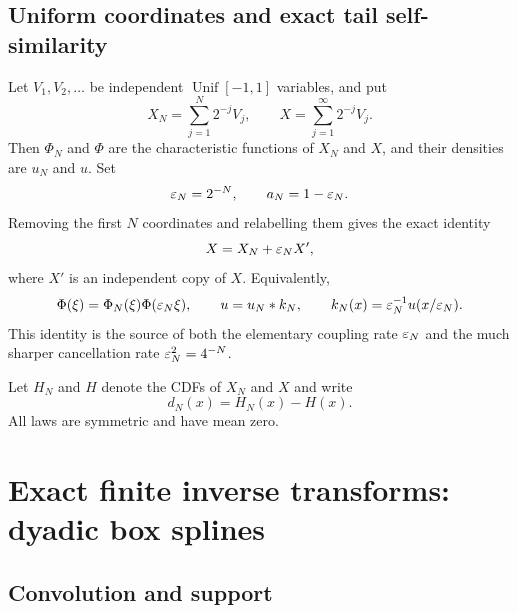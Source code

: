 \documentclass[11pt,oneside]{article}
\numberwithin{equation}{section}
\theoremstyle{definition}
\theoremstyle{remark}
\begin{document}
\subsection{Uniform coordinates and exact tail self-similarity}

Let $V_1,V_2,\ldots$ be independent $\operatorname{Unif}[-1,1]$ variables, and put
\begin{equation}
 X_N=\sum_{j=1}^{N}2^{-j}V_j,
 \qquad
 X=\sum_{j=1}^{\infty}2^{-j}V_j.
 \label{p5:eq:random-series}
\end{equation}
Then $\Phi_N$ and $\Phi$ are the characteristic functions of $X_N$ and $X$, and their densities are $u_N$ and $u$.  Set
\begin{equation}
 \varepsilon_N=2^{-N},\qquad a_N=1-\varepsilon_N.
 \label{p5:eq:eps-a}
\end{equation}
Removing the first $N$ coordinates and relabelling them gives the exact identity
\begin{equation}
 X=X_N+\varepsilon_N X',
 \label{p5:eq:tail-coupling}
\end{equation}
where $X'$ is an independent copy of $X$.  Equivalently,
\begin{equation}
 \Phi(\xi)=\Phi_N(\xi)\Phi(\varepsilon_N\xi),
 \qquad
 u=u_N*k_N,
 \qquad
 k_N(x)=\varepsilon_N^{-1}u(x/\varepsilon_N).
 \label{p5:eq:tail-factorization}
\end{equation}
This identity is the source of both the elementary coupling rate $\varepsilon_N$ and the much sharper cancellation rate $\varepsilon_N^2=4^{-N}$.

Let $H_N$ and $H$ denote the CDFs of $X_N$ and $X$ and write
\begin{equation}
 d_N(x)=H_N(x)-H(x).
 \label{p5:eq:dN}
\end{equation}
All laws are symmetric and have mean zero.

\section{Exact finite inverse transforms: dyadic box splines}
\label{p5:sec:splines}

\subsection{Convolution and support}
\end{document}
